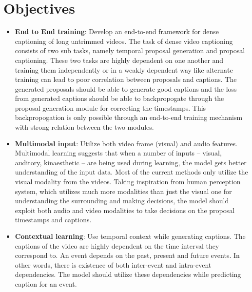 \section{Objectives}

\par %

\begin{itemize}
	\item \textbf{End to End training}: Develop an end-to-end framework for dense captioning of long untrimmed videos. The task of dense video captioning consists of two sub tasks, namely temporal proposal generation and proposal captioning. These two tasks are highly dependent on one another and training them independently or in a weakly dependent way like alternate training can lead to poor correlation between proposals and captions. The generated proposals should be able to generate good captions and the loss from generated captions should be able to backpropogate through the proposal generation module for correcting the timestamps. This backpropogation is only possible through an end-to-end training mechanism with strong relation between the two modules.
	\item \textbf{Multimodal input}: Utilize both video frame (visual) and audio features. Multimodal learning suggests that when a number of inputs – visual, auditory, kinaesthetic – are being used during learning, the model gets better understanding of the input data. Most of the current methods only utilize the visual modality from the videos. Taking inspiration from human perception system, which utilizes much more modalities than just the visual one for understanding the surrounding and making decisions, the model should exploit both audio and video modalities to take decisions on the proposal timestamps and captions.
	\item \textbf{Contextual learning}: Use temporal context while generating captions. The captions of the video are highly dependent on the time interval they correspond to. An event depends on the past, present and future events. In other words, there is existence of both inter-event and intra-event dependencies. The model should utilize these dependencies while predicting caption for an event.
\end{itemize}